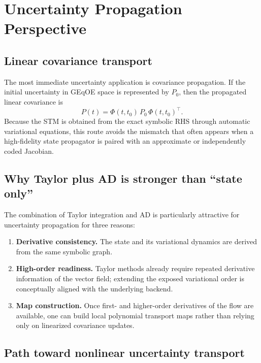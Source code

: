 \documentclass[11pt]{article}
\begin{document}
\section{Uncertainty Propagation Perspective}

\subsection{Linear covariance transport}

The most immediate uncertainty application is covariance propagation. If the
initial uncertainty in GEqOE space is represented by $P_0$, then the propagated
linear covariance is
\begin{equation}
P(t) = \Phi(t,t_0)\, P_0\, \Phi(t,t_0)^\top.
\end{equation}
Because the STM is obtained from the exact symbolic RHS through automatic
variational equations, this route avoids the mismatch that often appears when a
high-fidelity state propagator is paired with an approximate or independently
coded Jacobian.

\subsection{Why Taylor plus AD is stronger than ``state only''}

The combination of Taylor integration and AD is particularly attractive for
uncertainty propagation for three reasons:
\begin{enumerate}
    \item \textbf{Derivative consistency.} The state and its variational
    dynamics are derived from the same symbolic graph.
    \item \textbf{High-order readiness.} Taylor methods already require repeated
    derivative information of the vector field; extending the exposed
    variational order is conceptually aligned with the underlying backend.
    \item \textbf{Map construction.} Once first- and higher-order derivatives of
    the flow are available, one can build local polynomial transport maps rather
    than relying only on linearized covariance updates.
\end{enumerate}

\subsection{Path toward nonlinear uncertainty transport}
\end{document}
